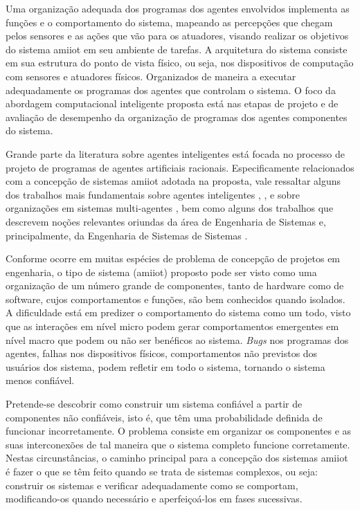     Uma organização adequada dos programas dos agentes envolvidos implementa as funções e o comportamento do sistema, mapeando as percepções que chegam pelos sensores e as ações que vão para os atuadores, visando realizar os objetivos do sistema \acrshort{amiiot} em seu ambiente de tarefas. A arquitetura do sistema  consiste em sua estrutura do ponto de vista físico, ou seja, nos dispositivos de computação com sensores e atuadores físicos. Organizados de maneira a executar adequadamente os programas dos agentes que controlam o sistema. O foco da abordagem computacional inteligente proposta está nas etapas de projeto e de avaliação de desempenho da organização de programas dos agentes componentes do sistema.
    
    Grande parte da literatura sobre agentes inteligentes está focada no processo de projeto de programas de agentes artificiais racionais. Especificamente relacionados com a concepção de sistemas \acrshort{amiiot} adotada na proposta, vale ressaltar alguns dos trabalhos mais fundamentais sobre agentes inteligentes \cite{norvig2004inteligencia}, \cite{wooldridge2009introduction}, e sobre organizações em sistemas multi-agentes \cite{hubner2002model}, bem como alguns dos trabalhos que descrevem noções relevantes oriundas da área de Engenharia de Sistemas \cite{simon1996sciences} e, principalmente, da Engenharia de Sistemas de Sistemas \cite{simon1996sciences, barry2009agent}.

    Conforme ocorre em muitas espécies de problema de concepção de projetos em engenharia, o tipo de sistema (\acrshort{amiiot}) proposto pode ser visto como uma organização de um número grande de componentes, tanto de hardware como de software, cujos comportamentos e funções, são bem conhecidos quando isolados. A dificuldade está em predizer o comportamento do sistema como um todo, visto que as interações em nível micro podem gerar comportamentos emergentes em nível macro que podem ou não ser benéficos ao sistema. \textit{Bugs} nos programas dos agentes, falhas nos dispositivos físicos, comportamentos não previstos dos usuários dos sistema, podem refletir em todo o sistema, tornando o sistema menos confiável. 


    Pretende-se descobrir como construir um sistema confiável a partir de componentes não confiáveis, isto é, que têm uma probabilidade definida de funcionar incorretamente. O problema consiste em organizar os componentes e as suas interconexões de tal maneira que o sistema completo funcione corretamente. Nestas circunstâncias, o caminho principal para a concepção dos sistemas \acrshort{amiiot} é fazer o que se têm feito quando se trata de sistemas complexos, ou seja: construir os sistemas e verificar adequadamente como se comportam, modificando-os quando necessário e aperfeiçoá-los em fases sucessivas.

